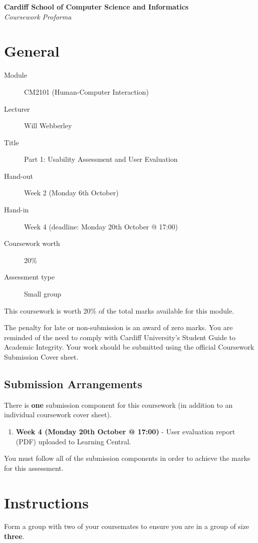 \documentclass[11pt,a4paper]{report}
\begin{document}
\Large\textbf{Cardiff School of Computer Science and Informatics}\\
\large\textit{Coursework Proforma}
\vskip30pt

\section*{General}

\begin{description}
    \item[Module] CM2101 (Human-Computer Interaction)
    \item[Lecturer] Will Webberley
    \item[Title] Part 1: Usability Assessment and User Evaluation 
    \item[Hand-out] Week 2 (Monday 6th October)
    \item[Hand-in] Week 4 (deadline: Monday 20th October @ 17:00)
    \item[Coursework worth] 20\%
    \item[Assessment type] Small group 
\end{description}
This coursework is worth 20\% of the total marks available for this module.

The penalty for late or non-submission is an award of zero marks. You are reminded of the need to comply with Cardiff University's Student Guide to Academic Integrity. Your work should be submitted using the official Coursework Submission Cover sheet.

\subsection*{Submission Arrangements}
There is \textbf{one} submission component for this coursework (in addition to an individual coursework cover sheet).
\begin{enumerate}
    \item \textbf{Week 4 (Monday 20th October @ 17:00)} - User evaluation report (PDF) uploaded to Learning Central. 
\end{enumerate}
You must follow all of the submission components in order to achieve the marks for this assessment.

\section*{Instructions}
Form a group with two of your coursemates to ensure you are in a group of size \textbf{three}.
\end{document}

